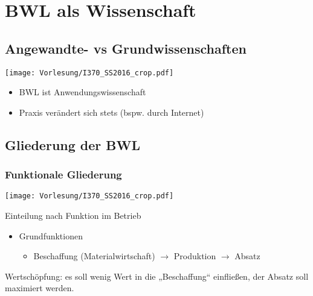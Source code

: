 




\newcommand{\folie}[1]{\begin{center}
\texttt{[image: Vorlesung/I370\_SS2016\_crop.pdf]}
\end{center}}



\maketitle
\newpage
\tableofcontents
\newpage


\chapter{BWL als Wissenschaft}
\section{Angewandte- vs Grundwissenschaften}
\folie{10}
\begin{itemize}
\item BWL ist Anwendungswissenschaft
\item Praxis verändert sich stets (bspw. durch Internet)
\end{itemize}
\section{Gliederung der BWL}
\subsection{Funktionale Gliederung}
\folie{11}
Einteilung nach Funktion im Betrieb
\begin{itemize}
\item Grundfunktionen
\begin{itemize}
\item Beschaffung (Materialwirtschaft) $\rightarrow$ Produktion $\rightarrow$ Absatz
\end{itemize}
\end{itemize}
Wertschöpfung: es soll wenig Wert in die „Beschaffung“ einfließen, der Absatz soll maximiert werden.
